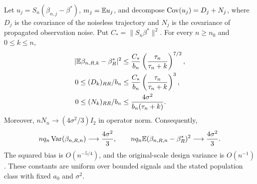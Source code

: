 \begin{proposition}
 \label{prop:budget}
 Let $u_j = S_n(\beta_{n,j} - \beta^*)$, $m_j = \mathbb{E} u_j$, and decompose
 $\operatorname{Cov}(u_j) = D_j + N_j$, where $D_j$ is the covariance of the noiseless
 trajectory and $N_j$ is the covariance of propagated observation noise. Put
 $C_* = \|S_n\beta^*\|^2$. For every $n \ge n_0$ and $0 \le k \le n$,
 \begin{align}
  |\mathbb{E}\beta_{n,R,k} - \beta_R^*|^2 & \le \frac{C_*}{b_n} \left( \frac{\tau_n}{\tau_n + k} \right)^{7/2},\label{eq:budget-bias} \\
  0 \le (D_k)_{RR}/b_n            & \le \frac{C_*}{b_n} \left( \frac{\tau_n}{\tau_n + k} \right)^3,\label{eq:budget-design}   \\
  0 \le (N_k)_{RR}/b_n            & \le \frac{4\sigma^2}{b_n(\tau_n + k)}.\label{eq:budget-noise}
 \end{align}
 Moreover, $nN_n \to (4\sigma^2/3)I_2$ in operator norm. Consequently,
 \begin{equation}
  \label{eq:budget-mse}
  nq_n\operatorname{Var}(\beta_{n,R,n}) \longrightarrow \frac{4\sigma^2}{3}, \qquad nq_n\mathbb{E}(\beta_{n,R,n} - \beta_R^*)^2
                          \longrightarrow \frac{4\sigma^2}{3}.
 \end{equation}
 The squared bias is $O(n^{-5/4})$, and the original-scale design variance is
 $O(n^{-1})$. These constants are uniform over bounded signals and the stated
 population class with fixed $a_0$ and $\sigma^2$.
\end{proposition}

